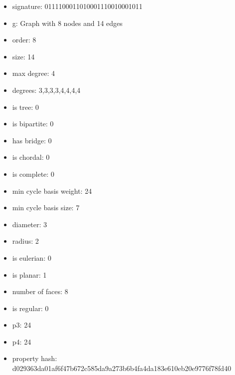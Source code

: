 \begin{itemize}
\item signature: 0111100011010001110010001011
\item g: Graph with 8 nodes and 14 edges
\item order: 8
\item size: 14
\item max degree: 4
\item degrees: 3,3,3,3,4,4,4,4
\item is tree: 0
\item is bipartite: 0
\item has bridge: 0
\item is chordal: 0
\item is complete: 0
\item min cycle basis weight: 24
\item min cycle basis size: 7
\item diameter: 3
\item radius: 2
\item is eulerian: 0
\item is planar: 1
\item number of faces: 8
\item is regular: 0
\item p3: 24
\item p4: 24
\item property hash: d029363da01af6f47b672c585da9a273b6b4fa4da183e610eb20e9776f78fd40
\end{itemize}
\newpage
\begin{figure}
\end{figure}
